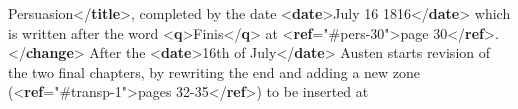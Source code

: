 \begin{shaded}
\hspace*{1em}\hspace*{1em}Persuasion{</\textbf{title}>}, completed by the date {<\textbf{date}>}July 16 1816{</\textbf{date}>}\mbox{}\newline 
\hspace*{1em}\hspace*{1em}\hspace*{1em}\hspace*{1em}\hspace*{1em}\hspace*{1em} which is written after the word {<\textbf{q}>}Finis{</\textbf{q}>} at {<\textbf{ref}\hspace*{1em}{target}="{\#pers-30}">}page\mbox{}\newline 
\hspace*{1em}\hspace*{1em}\hspace*{1em}\hspace*{1em}\hspace*{1em}\hspace*{1em}\hspace*{1em}\hspace*{1em} 30{</\textbf{ref}>}.{</\textbf{change}>}\mbox{}\newline 
\hspace*{1em}\hspace*{1em}After the {<\textbf{date}>}16th of July{</\textbf{date}>}\mbox{}\newline 
\hspace*{1em}\hspace*{1em}\hspace*{1em}\hspace*{1em}\hspace*{1em}\hspace*{1em} Austen starts revision of the two final chapters, by rewriting the end and\mbox{}\newline 
\hspace*{1em}\hspace*{1em}\hspace*{1em}\hspace*{1em}\hspace*{1em}\hspace*{1em} adding a new zone ({<\textbf{ref}\hspace*{1em}{target}="{\#transp-1}">}pages 32-35{</\textbf{ref}>}) to be inserted at\mbox{}\newline 

\end{shaded}
